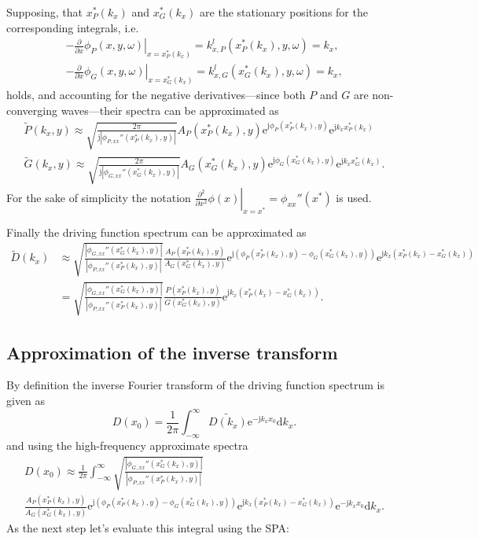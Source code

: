 \documentclass[12pt,a4paper]{article}
\newcommand{\td}{\mathrm{d}}
\newcommand{\te}{\mathrm{e}}
\newcommand{\ti}{\mathrm{j}}
\begin{document}
Supposing, that $x^*_P(k_x)$ and $x^*_G(k_x)$ are the stationary positions for the corresponding integrals, i.e. 
\begin{eqnarray}
- \left. \frac{\partial}{\partial x} \phi_P(x,y,\omega) \right|_{x = x^*_P(k_x)} = k_{x,P}^l(x^*_P(k_x),y,\omega) = k_x, \label{eq:klP} \\
- \left. \frac{\partial}{\partial x} \phi_G(x,y,\omega) \right|_{x = x^*_G(k_x)} = k_{x,G}^l(x^*_G(k_x),y,\omega) = k_x, \label{eq:klG} 
\label{eq:xP_xG_in_spatial_domain}
\end{eqnarray}
holds, and accounting for the negative derivatives---since both $P$ and $G$ are non-converging waves---their spectra can be approximated as
\begin{eqnarray}
\tilde{P}(k_x,y) \approx \sqrt{\frac{2\pi}{\ti |\phi_{P,xx}''(x^*_P(k_x),y)|}} A_P(x^*_P(k_x),y) \te^{\ti \phi_P(x^*_P(k_x),y)} \te^{\ti k_x x^*_P(k_x)}
\\
\tilde{G}(k_x,y) \approx \sqrt{\frac{2\pi}{\ti |\phi_{G,xx}''(x^*_G(k_x),y)|}} A_G(x^*_G(k_x),y) \te^{\ti \phi_G(x^*_G(k_x),y)} \te^{\ti k_x x^*_G(k_x)}
.
\end{eqnarray}
For the sake of simplicity the notation $\left. \frac{\partial^2}{\partial x^2} \phi(x)\right|_{x = x^*} = \phi_{xx}''(x^*)$ is used.

Finally the driving function spectrum can be approximated as
\begin{align}
\tilde{D}(k_x)
&\approx 
\sqrt{\frac{|\phi_{G,xx}''(x^*_G(k_x),y)|}{|\phi_{P,xx}''(x^*_P(k_x),y)|}}
\frac{A_P(x^*_P(k_x),y)}{A_G(x^*_G(k_x),y)}
\te^{\ti \left( \phi_P(x^*_P(k_x),y) - \phi_G(x^*_G(k_x),y)\right)}
\te^{\ti k_x \left( x^*_P(k_x) - x^*_G(k_x)\right)}
\\
&=\sqrt{\frac{|\phi_{G,xx}''(x^*_G(k_x),y)|}{|\phi_{P,xx}''(x^*_P(k_x),y)|}}
\frac{P(x^*_P(k_x),y)}{G(x^*_G(k_x),y)}
\te^{\ti k_x \left( x^*_P(k_x) - x^*_G(k_x)\right)}.
\end{align}


\subsection{Approximation of the inverse transform}

By definition the inverse Fourier transform of the driving function spectrum is given as
\begin{equation}
D(x_0) = \frac{1}{2\pi} \int_{-\infty}^{\infty} \tilde{D(k_x)} \te^{-\ti k_x x_0} \td k_x.
\label{eq:inverse_transform}
\end{equation}
and using the high-frequency approximate spectra
\begin{multline}
D(x_0) \approx \frac{1}{2\pi} \int_{-\infty}^{\infty} 
\sqrt{\frac{|\phi_{G,xx}''(x^*_G(k_x),y)|}{|\phi_{P,xx}''(x^*_P(k_x),y)|}}
\\
\frac{A_P(x^*_P(k_x),y)}{A_G(x^*_G(k_x),y)}
\te^{\ti \left( \phi_P(x^*_P(k_x),y) - \phi_G(x^*_G(k_x),y)\right)}
\te^{\ti k_x \left( x^*_P(k_x) - x^*_G(k_x)\right)}
 \te^{-\ti k_x x_0} \td k_x.
\label{eq:inverse_transform_2}
\end{multline}
As the next step let's evaluate this integral using the SPA:
\end{document}
